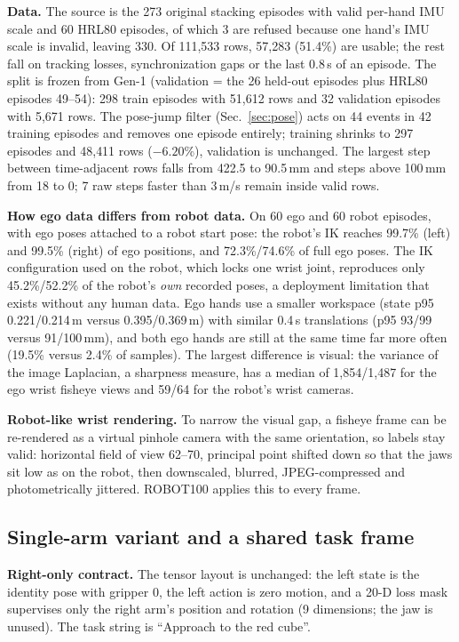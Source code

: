 \documentclass[conference,10pt]{IEEEtran}
\newcommand{\mm}{\,mm\xspace}
\begin{document}
\textbf{Data.} The source is the 273 original stacking episodes with valid per-hand IMU scale and 60 HRL80 episodes, of which 3
are refused because one hand's IMU scale is invalid, leaving 330. Of 111{,}533 rows, 57{,}283 (51.4\%) are usable; the rest fall on
tracking losses, synchronization gaps or the last 0.8\,s of an episode. The split is frozen from Gen-1 (validation = the 26 held-out
episodes plus HRL80 episodes 49--54): 298 train episodes with 51{,}612 rows and 32 validation episodes with 5{,}671 rows. The
pose-jump filter (Sec.~\ref{sec:pose}) acts on 44 events in 42 training episodes and removes one episode entirely; training
shrinks to 297 episodes and 48{,}411 rows ($-6.20$\%), validation is unchanged. The largest step between time-adjacent rows falls
from 422.5 to 90.5\mm and steps above 100\mm from 18 to 0; 7 raw steps faster than 3\,m/s remain inside valid rows.

\textbf{How ego data differs from robot data.} On 60 ego and 60 robot episodes, with ego poses attached to a robot start pose: the
robot's IK reaches 99.7\% (left) and 99.5\% (right) of ego positions, and 72.3\%/74.6\% of full ego poses. The IK configuration used on
the robot, which locks one wrist joint, reproduces only 45.2\%/52.2\% of the robot's \emph{own} recorded poses, a deployment
limitation that exists without any human data. Ego hands use a smaller workspace (state p95 0.221/0.214\,m versus 0.395/0.369\,m)
with similar 0.4\,s translations (p95 93/99 versus 91/100\mm), and both ego hands are still at the same time far more often (19.5\%
versus 2.4\% of samples). The largest difference is visual: the variance of the image Laplacian, a sharpness measure, has a median
of 1{,}854/1{,}487 for the ego wrist fisheye views and 59/64 for the robot's wrist cameras.

\textbf{Robot-like wrist rendering.} To narrow the visual gap, a fisheye frame can be re-rendered as a virtual pinhole camera with
the same orientation, so labels stay valid: horizontal field of view 62--70\textdegree, principal point shifted down so that the
jaws sit low as on the robot, then downscaled, blurred, JPEG-compressed and photometrically jittered. ROBOT100 applies this to every
frame.

\subsection{Single-arm variant and a shared task frame}
\textbf{Right-only contract.} The tensor layout is unchanged: the left state is the identity pose with gripper 0, the left action is
zero motion, and a 20-D loss mask supervises only the right arm's position and rotation (9 dimensions; the jaw is unused). The task
string is ``Approach to the red cube''.
\end{document}
